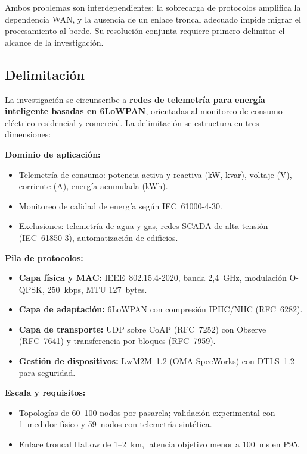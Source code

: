 Ambos problemas son interdependientes: la sobrecarga de protocolos amplifica la dependencia WAN, y la ausencia de un enlace troncal adecuado impide migrar el procesamiento al borde. Su resolución conjunta requiere primero delimitar el alcance de la investigación.

\subsection{Delimitación}

La investigación se circunscribe a \textbf{redes de telemetría para energía inteligente basadas en 6LoWPAN}, orientadas al monitoreo de consumo eléctrico residencial y comercial. La delimitación se estructura en tres dimensiones:

\textbf{Dominio de aplicación:}
\begin{itemize}
    \item Telemetría de consumo: potencia activa y reactiva (kW, kvar), voltaje (V), corriente (A), energía acumulada (kWh).
    \item Monitoreo de calidad de energía según IEC~61000-4-30.
    \item Exclusiones: telemetría de agua y gas, redes SCADA de alta tensión (IEC~61850-3), automatización de edificios.
\end{itemize}

\textbf{Pila de protocolos:}
\begin{itemize}
    \item \textbf{Capa física y MAC:} IEEE~802.15.4-2020, banda 2,4~GHz, modulación O-QPSK, 250~kbps, MTU 127~bytes.
    \item \textbf{Capa de adaptación:} 6LoWPAN con compresión IPHC/NHC (RFC~6282).
    \item \textbf{Capa de transporte:} UDP sobre CoAP (RFC~7252) con Observe (RFC~7641) y transferencia por bloques (RFC~7959).
    \item \textbf{Gestión de dispositivos:} LwM2M~1.2 (OMA SpecWorks) con DTLS~1.2 para seguridad.
\end{itemize}

\textbf{Escala y requisitos:}
\begin{itemize}
    \item Topologías de 60--100 nodos por pasarela; validación experimental con 1~medidor físico y 59~nodos con telemetría sintética.
    \item Enlace troncal HaLow de 1--2~km, latencia objetivo menor a 100~ms en P95.
\end{itemize}

